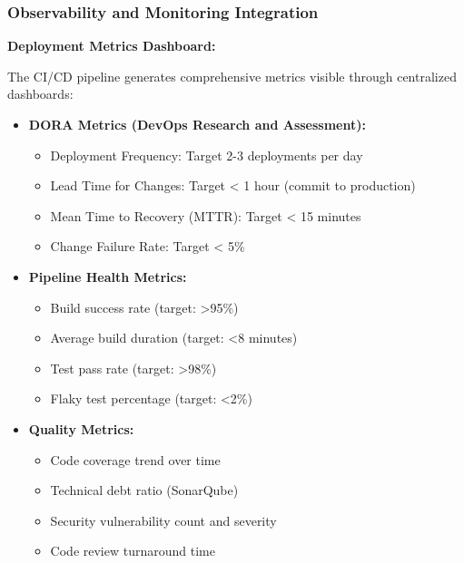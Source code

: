\documentclass[12pt,a4paper]{article}
\begin{document}
\subsubsection{Observability and Monitoring Integration}

\textbf{Deployment Metrics Dashboard:}

The CI/CD pipeline generates comprehensive metrics visible through centralized dashboards:

\begin{itemize}[leftmargin=2em, itemsep=6pt]
    \item \textbf{DORA Metrics (DevOps Research and Assessment):}
    \begin{itemize}[leftmargin=2em, itemsep=4pt]
        \item Deployment Frequency: Target 2-3 deployments per day
        \item Lead Time for Changes: Target < 1 hour (commit to production)
        \item Mean Time to Recovery (MTTR): Target < 15 minutes
        \item Change Failure Rate: Target < 5\%
    \end{itemize}
    
    \item \textbf{Pipeline Health Metrics:}
    \begin{itemize}[leftmargin=2em, itemsep=4pt]
        \item Build success rate (target: >95\%)
        \item Average build duration (target: <8 minutes)
        \item Test pass rate (target: >98\%)
        \item Flaky test percentage (target: <2\%)
    \end{itemize}
    
    \item \textbf{Quality Metrics:}
    \begin{itemize}[leftmargin=2em, itemsep=4pt]
        \item Code coverage trend over time
        \item Technical debt ratio (SonarQube)
        \item Security vulnerability count and severity
        \item Code review turnaround time
    \end{itemize}
\end{itemize}

\vspace{0.5em}
\end{document}
